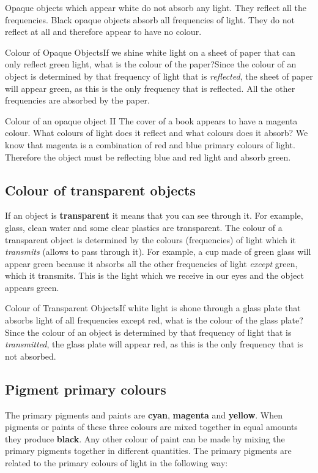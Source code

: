 Opaque objects which appear white do not absorb any light. They reflect all the frequencies.
Black opaque objects absorb all frequencies of light. They do not reflect at all and therefore appear to have no colour.

\begin{wex}
{Colour of Opaque Objects}{If we shine white light on a sheet of paper that can only reflect green light, what is the colour of the paper?}{Since the colour of an object is determined by that frequency of light that is \textit{reflected}, the sheet of paper will appear green, as this is the only frequency that is reflected. All the other frequencies are absorbed by the paper.}
\end{wex}

\begin{wex}{Colour of an opaque object II}
{The cover of a book appears to have a magenta colour. What colours of light does it reflect and what colours does it absorb?}
{We know that magenta is a combination of red and blue primary colours of light. Therefore the object must be reflecting blue and red light and absorb green. }
\end{wex}

\subsection{Colour of transparent objects}
If an object is \textbf{transparent} it means that you can see through it. For example, glass, clean water and some clear plastics are transparent. The colour of a transparent object is determined by the colours (frequencies) of light which it \textit{transmits} (allows to pass through it). For example, a cup made of green glass will appear green because it absorbs all the other frequencies of light \textit{except} green, which it transmits. This is the light which we receive in our eyes and the object appears green. 


\begin{wex}
{Colour of Transparent Objects}{If white light is shone through a glass plate that absorbs light of all frequencies except red, what is the colour of the glass plate?}
{Since the colour of an object is determined by that frequency of light that is \textit{transmitted}, the glass plate will appear red, as this is the only frequency that is not absorbed.}
\end{wex}



\subsection{Pigment primary colours}
The primary pigments and paints are \textbf{cyan}, \textbf{magenta} and \textbf{yellow}. When pigments or paints of these three colours are mixed together in equal amounts they produce \textbf{black}. Any other colour of paint can be made by mixing the primary pigments together in different quantities. The primary pigments are related to the primary colours of light in the following way:

